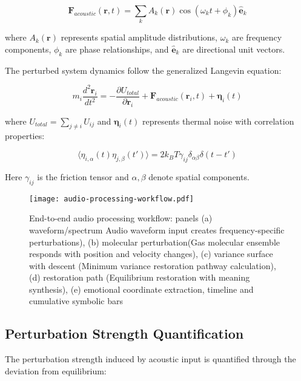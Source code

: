 \documentclass[12pt,a4paper]{article}
\begin{document}
\begin{equation}
\mathbf{F}_{acoustic}(\mathbf{r}, t) = \sum_{k} A_k(\mathbf{r}) \cos(\omega_k t + \phi_k) \hat{\mathbf{e}}_k
\end{equation}

where $A_k(\mathbf{r})$ represents spatial amplitude distributions, $\omega_k$ are frequency components, $\phi_k$ are phase relationships, and $\hat{\mathbf{e}}_k$ are directional unit vectors.

The perturbed system dynamics follow the generalized Langevin equation:

\begin{equation}
m_i \frac{d^2\mathbf{r}_i}{dt^2} = -\frac{\partial U_{total}}{\partial \mathbf{r}_i} + \mathbf{F}_{acoustic}(\mathbf{r}_i, t) + \boldsymbol{\eta}_i(t)
\end{equation}

where $U_{total} = \sum_{j \neq i} U_{ij}$ and $\boldsymbol{\eta}_i(t)$ represents thermal noise with correlation properties:

\begin{equation}
\langle \eta_{i,\alpha}(t) \eta_{j,\beta}(t') \rangle = 2k_B T \gamma_{ij} \delta_{\alpha\beta} \delta(t-t')
\end{equation}

Here $\gamma_{ij}$ is the friction tensor and $\alpha, \beta$ denote spatial components.

\begin{figure}[h]
\centering
\texttt{[image: audio-processing-workflow.pdf]}
\caption{End-to-end audio processing workflow: panels (a) waveform/spectrum Audio waveform input creates frequency-specific perturbations), (b) molecular perturbation(Gas molecular ensemble responds with position and velocity changes), (c) variance surface with descent (Minimum variance restoration pathway calculation), (d) restoration path (Equilibrium restoration with meaning synthesis), (e) emotional coordinate extraction, timeline and cumulative symbolic bars}
\label{fig:audio-processing-workflow}
\end{figure}

\subsection{Perturbation Strength Quantification}

The perturbation strength induced by acoustic input is quantified through the deviation from equilibrium:
\end{document}
